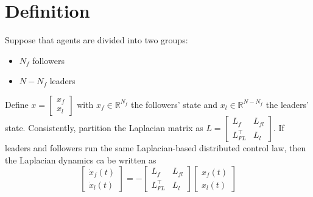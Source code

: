 \documentclass{book}
\newcommand{\R}{\mathbb{R}}
\theoremstyle{theoremv2}
\theoremstyle{defv2}
\theoremstyle{remark}
\theoremstyle{remark}
\theoremstyle{definition}
\theoremstyle{definition}
\begin{document}
\section{Definition}
Suppose that agents are divided into two groups: 
\begin{itemize}
    \item $N_f$ followers
    \item $N-N_f$ leaders
\end{itemize}
Define $x = \begin{bmatrix}
    x_f \\ x_l
\end{bmatrix}$ with $x_f\in\R^{N_f}$ the followers' state and $x_l\in\R^{N-N_f}$ the leaders' state.
Consistently, partition the Laplacian matrix as $L = \begin{bmatrix}
    L_f & L_{fl} \\ L_{FL}^\top & L_l
\end{bmatrix}$.
If leaders and followers run the same Laplacian-based distributed control law, then the Laplacian dynamics ca be written as 
\[
    \begin{bmatrix}
        \dot{x}_f(t) \\ \dot{x}_l(t) 
    \end{bmatrix} = -\begin{bmatrix}
        L_f & L_{fl} \\ L_{FL}^\top & L_l
    \end{bmatrix} \begin{bmatrix}
        x_f(t) \\ x_l(t)
    \end{bmatrix}
\]
\end{document}
